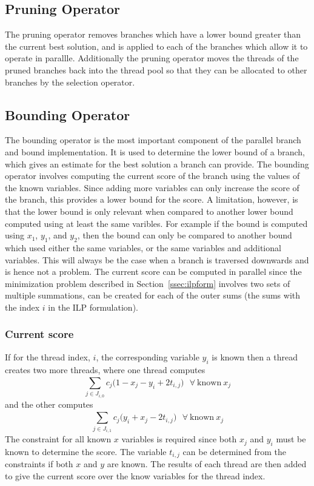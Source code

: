 \documentclass[10pt,twocolumn]{article}
\begin{document}
\subsection{Pruning Operator}

The pruning operator removes branches which have a lower bound greater than the current best
solution, and is applied to each of the branches which allow it to operate in parallle. Additionally the 
pruning operator moves the threads of the pruned branches back into the thread pool so that they can be
allocated to other branches by the selection operator.

\subsection{Bounding Operator} \label{sec:bounding}

The bounding operator is the most important component of the parallel branch and bound implementation. It is
used to determine the lower bound of a branch, which gives an estimate for the best solution a branch can
provide. 
The bounding operator involves computing the current score of the branch using the values of the
known variables. Since adding more variables can only increase the score of the branch, this provides a lower
bound for the score. A limitation, however, is that the lower bound is only relevant when compared to
another lower bound computed using at least the same varibles. For example if the bound is computed using
$x_1$, $y_1$, and $y_2$, then the bound can only be compared to another bound which used either the same variables,
or the same variables and additional variables. This will always be the case when a branch is traversed
downwards and is hence not a problem. The current score can be computed in parallel since the minimization 
problem described in Section~\ref{ssec:ilpform} involves two sets of multiple summations, can be created for
each of the outer sums (the sums with the index $i$ in the ILP formulation). 

\subsubsection{Current score}
If for the thread index, $i$, the corresponding variable $y_i$ is known then a thread creates two more 
threads, where one thread computes 
\begin{equation*}
    \sum_{j \in J_{i,0}}^{}{c_j(1 - x_j - y_i + 2t_{i,j}})  \ \ \ \forall \ \textrm{known} \ x_j
\end{equation*}
and the other computes
\begin{equation*}
    \sum_{j \in J_{i,1}}^{}{c_j(y_i + x_j - 2t_{i,j}})  \ \ \ \forall \ \textrm{known} \ x_j
\end{equation*}
The constraint for all known $x$ variables is required since both $x_j$ and $y_i$ must be known to determine
the score. The variable $t_{i,j}$ can be determined from the constraints if both $x$ and $y$ are known.
The results of each thread are then added to give the current score over the know variables for the thread
index.
\end{document}
